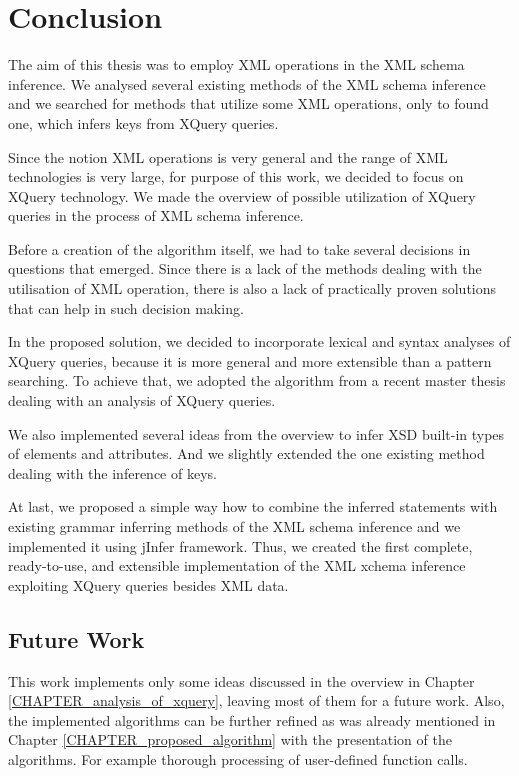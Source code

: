 \chapter{Conclusion}
The aim of this thesis was to employ XML operations in the XML schema inference. We analysed several existing methods of the XML schema inference and we searched for methods that utilize some XML operations, only to found one, which infers keys from XQuery queries.

Since the notion XML operations is very general and the range of XML technologies is very large, for purpose of this work, we decided to focus on XQuery technology. We made the overview of possible utilization of XQuery queries in the process of XML schema inference.

Before a creation of the algorithm itself, we had to take several decisions in questions that emerged. Since there is a lack of the methods dealing with the utilisation of XML operation, there is also a lack of practically proven solutions that can help in such decision making.

In the proposed solution, we decided to incorporate lexical and syntax analyses of XQuery queries, because it is more general and more extensible than a pattern searching. To achieve that, we adopted the algorithm from a recent master thesis dealing with an analysis of XQuery queries.

We also implemented several ideas from the overview to infer XSD built-in types of elements and attributes. And we slightly extended the one existing method dealing with the inference of keys. 

At last, we proposed a simple way how to combine the inferred statements with existing grammar inferring methods of the XML schema inference and we implemented it using jInfer framework. Thus, we created the first complete, ready-to-use, and extensible implementation of the XML xchema inference exploiting XQuery queries besides XML data.

\section{Future Work}
This work implements only some ideas discussed in the overview in Chapter \ref{CHAPTER_analysis_of_xquery}, leaving most of them for a future work. Also, the implemented algorithms can be further refined as was already mentioned in Chapter \ref{CHAPTER_proposed_algorithm} with the presentation of the algorithms. For example thorough processing of user-defined function calls.

